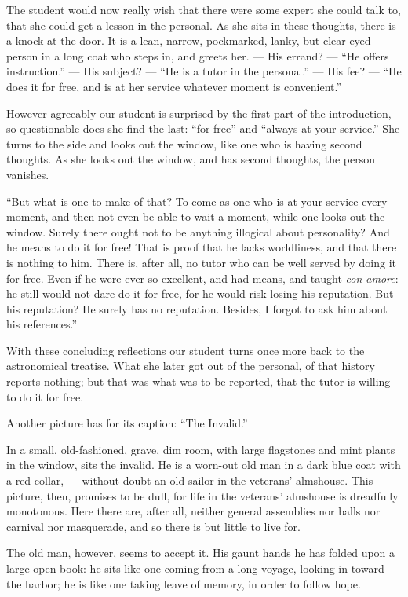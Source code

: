 \documentclass[12pt,a4paper]{book}
\begin{document}
The student would now really wish that there were some expert she could talk to, that she could get a lesson
in the personal. As she sits in these thoughts, there is a knock at the door. It is a lean, narrow, pockmarked, lanky, but clear-eyed person in a long coat who steps in, and greets her. --- His errand? --- ``He offers instruction.'' --- His subject? --- ``He is a tutor in the personal.'' --- His fee? --- ``He does it for free, and is at her service whatever moment is convenient.''

However agreeably our student is surprised by the first part of the introduction, so questionable does she find the last: ``for free'' and ``always at your service.'' She turns to the side and looks out the window, like one who is having second thoughts. As she looks out the window, and has second thoughts, the person vanishes.

``But what is one to make of that? To come as one who is at your service every moment, and then not even be able to wait a moment, while one looks out the window. Surely there ought not to be anything illogical about personality? And he means to do it for free! That is proof that he lacks worldliness, and that there is nothing to him. There is, after all, no tutor who can be well served by doing it for free. Even if he were ever so excellent, and had means, and taught \textit{con amore}: he still would not dare do it for free, for he would risk losing his reputation. But his reputation? He surely has no reputation. Besides, I forgot to ask him about his references.''

With these concluding reflections our student turns once more back to the astronomical treatise. What she later got out of the personal, of that history reports nothing; but that was what was to be reported, that the tutor is willing to do it for free.

Another picture has for its caption: ``The Invalid.''

In a small, old-fashioned, grave, dim room, with large flagstones and mint plants in the window, sits the invalid. He is a worn-out old man in a dark blue coat with a red collar, --- without doubt an old sailor in the veterans' almshouse.
This picture, then, promises to be dull, for life in the veterans' almshouse is dreadfully monotonous. Here there are, after all, neither general assemblies nor balls nor carnival nor masquerade, and so there is but little to live for.

The old man, however, seems to accept it. His gaunt hands he has folded upon a large open book: he sits like one coming from a long voyage, looking in toward the harbor; he is like one taking leave of memory, in order to follow hope.
\end{document}
